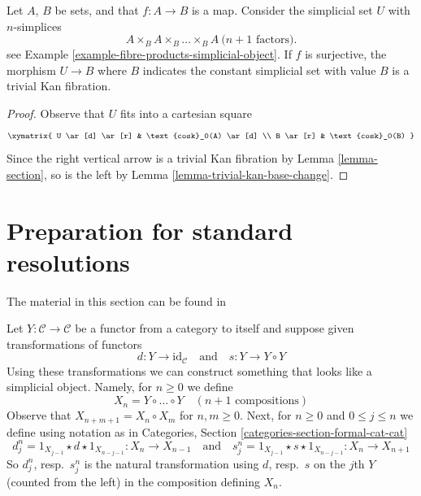 \begin{lemma}
\label{lemma-cosk-minus-one-equivalence}
Let $A$, $B$ be sets, and that $f : A \to B$ is a map. Consider the simplicial
set $U$ with $n$-simplices
$$
A \times_B A \times_B \ldots \times_B A\ (n + 1 \text{ factors)}.
$$
see Example \ref{example-fibre-products-simplicial-object}.
If $f$ is surjective, the morphism $U \to B$
where $B$ indicates the constant simplicial set with value $B$
is a trivial Kan fibration.
\end{lemma}

\begin{proof}
Observe that $U$ fits into a cartesian square
$$
\xymatrix{
U \ar[d] \ar[r] & \text{cosk}_0(A) \ar[d] \\
B \ar[r] & \text{cosk}_0(B)
}
$$
Since the right vertical arrow is a trivial Kan fibration by
Lemma \ref{lemma-section}, so is the left by
Lemma \ref{lemma-trivial-kan-base-change}.
\end{proof}











\section{Preparation for standard resolutions}
\label{section-standard-pre}

\noindent
The material in this section can be found in \cite[Appendix 1]{Godement}

\begin{example}
\label{example-godement}
Let $Y : \mathcal{C} \to \mathcal{C}$ be a functor from a category to
itself and suppose given transformations of functors
$$
d : Y \longrightarrow \text{id}_\mathcal{C}
\quad\text{and}\quad
s : Y \longrightarrow Y \circ Y
$$
Using these transformations we can construct something that looks
like a simplicial object. Namely, for $n \geq 0$ we define
$$
X_n = Y \circ \ldots \circ Y \quad (n + 1\text{ compositions})
$$
Observe that $X_{n + m + 1} = X_n \circ X_m$ for $n, m \geq 0$.
Next, for $n \geq 0$ and $0 \leq j \leq n$ we define using notation
as in Categories, Section \ref{categories-section-formal-cat-cat}
$$
d^n_j = 1_{X_{j - 1}} \star d \star 1_{X_{n - j - 1}} :
X_n
\to
X_{n - 1}
\quad\text{and}\quad
s^n_j = 1_{X_{j - 1}} \star s \star 1_{X_{n - j - 1}} :
X_n
\to
X_{n + 1}
$$
So $d^n_j$, resp.\ $s^n_j$ is the natural transformation using
$d$, resp.\ $s$ on the $j$th $Y$ (counted from the left) in the
composition defining $X_n$.
\end{example}

